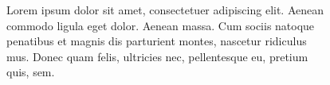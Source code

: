 \documentclass[gray]{subdocuments/open_science_poster}\usepackage{graphicx, color}
\newenvironment{knitrout}{}{} %
\begin{document}
\begin{frame}[t]
\begin{columns}[t]
\begin{column}{0.28\paperwidth}
			\begin{exampleblock}{}
				\begin{figure}[H] %
				\centering
				\caption{Lorem ipsum dolor sit amet, consectetuer adipiscing elit. Aenean
				commodo ligula eget dolor. Aenean massa. Cum sociis natoque penatibus et
				magnis dis parturient montes, nascetur ridiculus mus. Donec quam felis,
				ultricies nec, pellentesque eu, pretium quis, sem.}
				\label{fig:test_plot}
			\end{figure} %
		\end{exampleblock}

		\end{column}


	\begin{column}{0.28\paperwidth}


\end{column}
\end{columns}
\end{frame}
\end{document}
